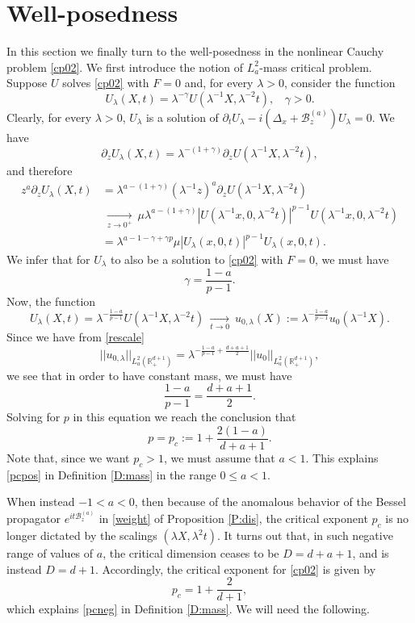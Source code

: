 \documentclass[11pt,letter]{amsart}
\def \RN {\mathbb{R}_+^{d+1}}
\newcommand{\Ba}{\mathscr B_z^{(a)}}
\newcommand{\p}{\partial}
\newcommand{\la}{\lambda}
\numberwithin{equation}{section}
\numberwithin{equation}{section}
\begin{document}
\section{Well-posedness}\label{S:well}

In this section we finally turn to the well-posedness in the nonlinear Cauchy problem \eqref{cp02}. We first introduce the notion of $L^2_a$-mass critical problem. Suppose $U$ solves \eqref{cp02} with $F= 0$ and, for every $\la>0$, consider the function
\[
U_\la(X,t) = \la^{-\gamma} U(\la^{-1} X, \la^{-2} t),\ \ \ \ \gamma>0.
\]
Clearly, for every $\la>0$, $U_\la$ is a solution of $\p_t U_\la - i(\Delta_x  + \Ba)U_\la = 0$. We have
\[
\p_z U_\la(X,t) = \la^{-(1+\gamma)} \p_z U(\la^{-1} X, \la^{-2} t),
\]
and therefore 
\begin{align*}
z^a \p_z U_\la(X,t)& = \la^{a-(1+\gamma)} (\la^{-1}z)^a \p_z U(\la^{-1} X, \la^{-2} t)
\\
& \ \underset{z\to 0^+}{\longrightarrow}\ \mu \la^{a-(1+\gamma)} |U(\la^{-1} x,0,\la^{-2} t)|^{p-1} U(\la^{-1} x,0,\la^{-2} t)
\\
& = \la^{a-1 - \gamma + \gamma p} \mu |U_\la(x,0,t)|^{p-1} U_\la(x,0,t).
\end{align*}
We infer that for $U_\la$ to also be a solution to \eqref{cp02} with $F=0$, we must have
\[
\gamma = \frac{1-a}{p-1}.
\]
Now, the function 
\[
U_\la(X,t) = \la^{-\frac{1-a}{p-1}} U(\la^{-1} X , \la^{-2} t)\ \underset{t\to 0}{\longrightarrow}\ u_{0,\la}(X) := \la^{-\frac{1-a}{p-1}} u_0(\la^{-1}X).
\]
Since we have from \eqref{rescale}
\[
||u_{0,\la}||_{L^2_a(\RN)} = \la^{-\frac{1-a}{p-1}+\frac{d+a+1}2} ||u_{0}||_{L^2_a(\RN)},
\]
we see that in order to have constant mass, we must have
\[
\frac{1-a}{p-1} = \frac{d+a+1}2.
\]
Solving for $p$ in this equation we reach the conclusion that
\[
p = p_c := 1 + \frac{2(1-a)}{d+a+1}.
\]
Note that, since we want $p_c>1$, we must assume that $a<1$. This explains \eqref{pcpos} in Definition \ref{D:mass} in the range  $0\le a<1$. 

When instead $-1<a<0$, then because of the anomalous behavior of the Bessel propagator $e^{i t\Ba}$ in \eqref{weight} of Proposition \ref{P:dis}, the critical exponent $p_c$ is no longer dictated by the scalings $(\la X,\la^2 t)$. It turns out that, in such negative range of values of $a$, the critical dimension ceases to be $D = d+a+1$, and is instead $D = d+1$. Accordingly, the critical exponent for \eqref{cp02} is given by
\[
p_c = 1 + \frac{2}{d+1},
\]
which explains \eqref{pcneg} in Definition \ref{D:mass}.
We will need the following.
\end{document}
